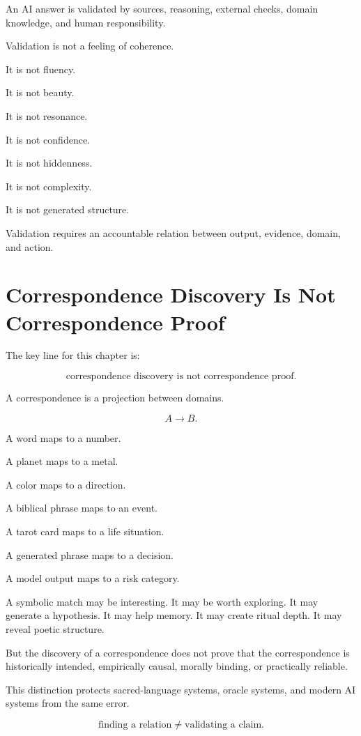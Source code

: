 \documentclass[11pt]{book}
\begin{document}
An AI answer is validated by sources, reasoning, external checks, domain knowledge, and human responsibility.

Validation is not a feeling of coherence.

It is not fluency.

It is not beauty.

It is not resonance.

It is not confidence.

It is not hiddenness.

It is not complexity.

It is not generated structure.

Validation requires an accountable relation between output, evidence, domain, and action.

\section{Correspondence Discovery Is Not Correspondence Proof}

The key line for this chapter is:

\[
\text{correspondence discovery is not correspondence proof}.
\]

A correspondence is a projection between domains.

\[
A \rightarrow B.
\]

A word maps to a number.

A planet maps to a metal.

A color maps to a direction.

A biblical phrase maps to an event.

A tarot card maps to a life situation.

A generated phrase maps to a decision.

A model output maps to a risk category.

A symbolic match may be interesting. It may be worth exploring. It may generate a hypothesis. It may help memory. It may create ritual depth. It may reveal poetic structure.

But the discovery of a correspondence does not prove that the correspondence is historically intended, empirically causal, morally binding, or practically reliable.

This distinction protects sacred-language systems, oracle systems, and modern AI systems from the same error.

\[
\text{finding a relation} \neq \text{validating a claim}.
\]
\end{document}
